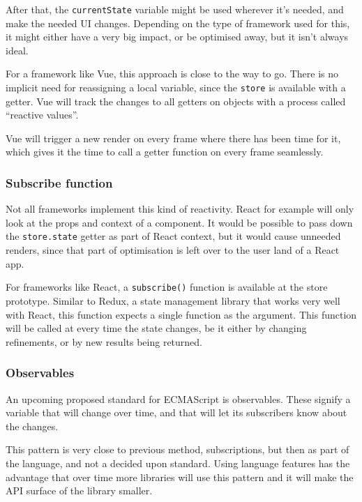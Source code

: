 After that, the {\tt currentState} variable might be used wherever it's needed, and make the needed UI changes. Depending on the type of framework used for this, it might either have a very big impact, or be optimised away, but it isn't always ideal.

For a framework like Vue\cite{vue-reactivity}, this approach is close to the way to go. There is no implicit need for reassigning a local variable, since the {\tt store} is available with a getter. Vue will track the changes to all getters on objects with a process called ``reactive values''.

Vue will trigger a new render on every frame where there has been time for it, which gives it the time to call a getter function on every frame seamlessly. 

\subsubsection{Subscribe function}
\label{ssub:subscribe_function}

Not all frameworks implement this kind of reactivity. React for example will only look at the props and context of a component. It would be possible to pass down the {\tt store.state} getter as part of React context, but it would cause unneeded renders, since that part of optimisation is left over to the user land of a React app. 

For frameworks like React, a {\tt subscribe()} function is available at the store prototype. Similar to Redux\cite{redux-glossary-store}, a state management library that works very well with React, this function expects a single function as the argument. This function will be called at every time the state changes, be it either by changing refinements, or by new results being returned.


\subsubsection{Observables}
\label{ssub:observables}

An upcoming proposed standard for ECMAScript is observables\cite{tc39-observable}. These signify a variable that will change over time, and that will let its subscribers know about the changes.

This pattern is very close to previous method, subscriptions, but then as part of the language, and not a decided upon standard. Using language features has the advantage that over time more libraries will use this pattern and it will make the API surface of the library smaller.

